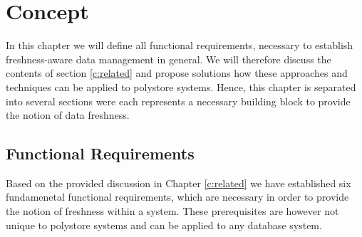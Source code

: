 \chapter{Concept}
\label{c:concept}


In this chapter we will define all functional requirements, necessary to establish freshness-aware data management in general.
We will therefore discuss the contents of section \ref{c:related} and propose solutions how these approaches and techniques can be applied to polystore systems.
Hence, this chapter is separated into several sections were each represents a necessary building block to provide the notion of data freshness.


\section{Functional Requirements}

Based on the provided discussion in Chapter \ref{c:related} we have established six  fundamenetal functional
requirements, which are necessary in order to provide the notion of freshness within a system.
These prerequisites are however not unique to polystore systems and can be applied to any database system. 

